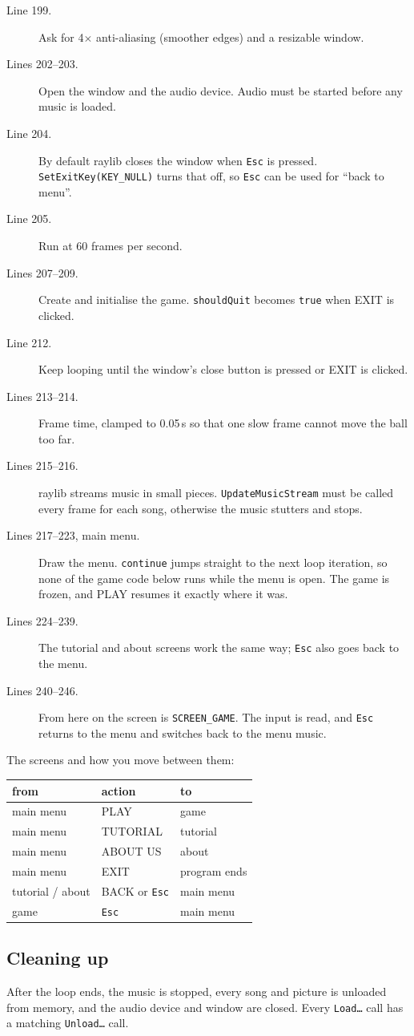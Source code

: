 \documentclass[11pt,a4paper]{article}
\newcommand{\code}[3]{}
\begin{document}
\code{main.c}{197}{246}

\begin{description}
  \item[Line 199.] Ask for 4$\times$ anti-aliasing (smoother edges) and a resizable window.
  \item[Lines 202--203.] Open the window and the audio device. Audio must be started before any music is loaded.
  \item[Line 204.] By default raylib closes the window when \texttt{Esc} is pressed. \texttt{SetExitKey(KEY\_NULL)}
  turns that off, so \texttt{Esc} can be used for ``back to menu''.
  \item[Line 205.] Run at 60 frames per second.
  \item[Lines 207--209.] Create and initialise the game. \texttt{shouldQuit} becomes \texttt{true} when EXIT is clicked.
  \item[Line 212.] Keep looping until the window's close button is pressed or EXIT is clicked.
  \item[Lines 213--214.] Frame time, clamped to 0.05\,s so that one slow frame cannot move the ball too far.
  \item[Lines 215--216.] raylib streams music in small pieces. \texttt{UpdateMusicStream} must be called every frame
  for each song, otherwise the music stutters and stops.
  \item[Lines 217--223, main menu.] Draw the menu. \texttt{continue} jumps straight to the next loop iteration, so none
  of the game code below runs while the menu is open. The game is frozen, and PLAY resumes it exactly where it was.
  \item[Lines 224--239.] The tutorial and about screens work the same way; \texttt{Esc} also goes back to the menu.
  \item[Lines 240--246.] From here on the screen is \texttt{SCREEN\_GAME}. The input is read, and \texttt{Esc} returns
  to the menu and switches back to the menu music.
\end{description}

The screens and how you move between them:

\begin{center}
\begin{tabular}{@{}lll@{}}
\toprule
from & action & to \\
\midrule
main menu & PLAY          & game \\
main menu & TUTORIAL      & tutorial \\
main menu & ABOUT US      & about \\
main menu & EXIT          & program ends \\
tutorial / about & BACK or \texttt{Esc} & main menu \\
game      & \texttt{Esc}  & main menu \\
\bottomrule
\end{tabular}
\end{center}

\subsection{Cleaning up}

\code{main.c}{309}{322}

After the loop ends, the music is stopped, every song and picture is unloaded from memory, and the audio device
and window are closed. Every \texttt{Load\dots} call has a matching \texttt{Unload\dots} call.
\end{document}
